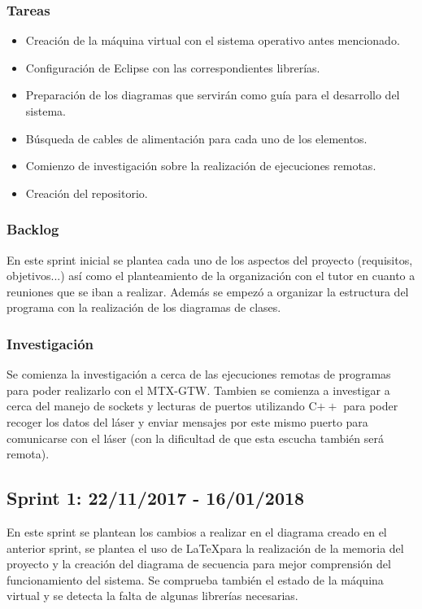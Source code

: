\subsubsection{Tareas}
\begin{itemize}
	\item Creación de la máquina virtual con el sistema operativo antes mencionado.
	\item Configuración de Eclipse con las correspondientes librerías.
	\item Preparación de los diagramas que servirán como guía para el desarrollo del sistema.
	\item Búsqueda de cables de alimentación para cada uno de los elementos.
	\item Comienzo de investigación sobre la realización de ejecuciones remotas.
	\item Creación del repositorio.
\end{itemize}
\subsubsection{Backlog}
En este sprint inicial se plantea cada uno de los aspectos del proyecto (requisitos, objetivos...) así como el planteamiento de la organización con el tutor en cuanto a reuniones que se iban a realizar. Además se empezó a organizar la estructura del programa con la realización de los diagramas de clases.\\
\subsubsection{Investigación}
Se comienza la investigación a cerca de las ejecuciones remotas de programas para poder realizarlo con el MTX-GTW. Tambien se comienza a investigar a cerca del manejo de sockets y lecturas de puertos utilizando C$++$ para poder recoger los datos del láser y enviar mensajes por este mismo puerto para comunicarse con el láser (con la dificultad de que esta escucha también será remota).\\

\subsection{Sprint 1: 22/11/2017 - 16/01/2018}
En este sprint se plantean los cambios a realizar en el diagrama creado en el anterior sprint, se plantea el uso de \LaTeX para la realización de la memoria del proyecto y la creación del diagrama de secuencia para mejor comprensión del funcionamiento del sistema. Se comprueba también el estado de la máquina virtual y se detecta la falta de algunas librerías necesarias. \\
